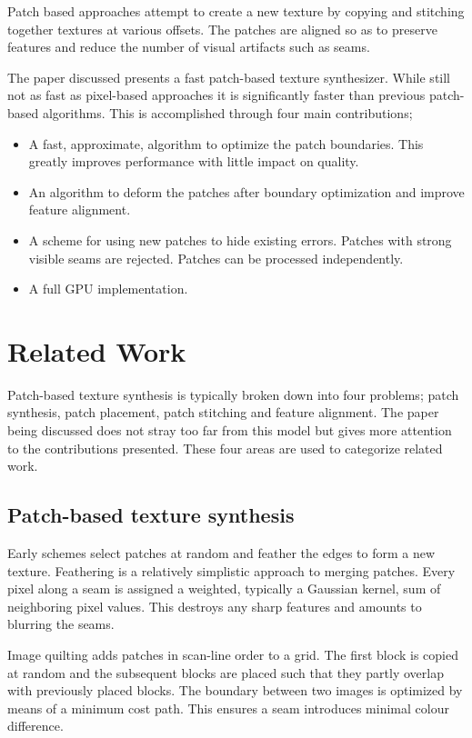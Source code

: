 \documentclass{acmsmall}
\begin{document}
Patch based approaches attempt to create a new texture by copying and stitching together textures at various offsets. The patches are aligned so as to preserve features and reduce the number of visual artifacts such as seams.

The paper discussed presents a  fast patch-based texture synthesizer. While still not as fast as pixel-based approaches it is significantly faster than previous patch-based algorithms. This is accomplished through four main contributions;

\begin{itemize}
\item A fast, approximate, algorithm to optimize the patch boundaries. This greatly improves performance with little impact on quality.
\item An algorithm to deform the patches after boundary optimization and improve feature alignment.
\item A scheme for using new patches to hide existing errors. Patches with strong visible seams are rejected. Patches can be processed independently.
\item A full GPU implementation.
\end{itemize}



\section{Related Work}

Patch-based texture synthesis is typically broken down into four problems; patch synthesis, patch placement, patch stitching and feature alignment. The paper being discussed does not stray too far from this model but gives more attention to the contributions presented. These four areas are used to categorize related work.

\subsection{Patch-based texture synthesis}
Early schemes select patches at random and feather the edges to form a new texture\cite{guo2000chaos}. Feathering is a relatively simplistic approach to merging patches. Every pixel along a seam is assigned a weighted, typically a Gaussian kernel, sum of neighboring pixel values. This destroys any sharp features and amounts to blurring the seams.

Image quilting adds patches in scan-line order to a grid. The first block is copied at random and the subsequent blocks are placed such that they partly overlap with previously placed blocks. The boundary between two images is optimized by means of a minimum cost path. This ensures a seam introduces minimal colour difference\cite{efros2001image}.
\end{document}
